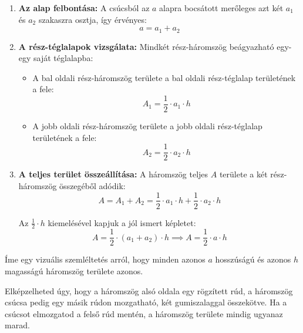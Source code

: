 \documentclass{article}
\begin{document}
\begin{enumerate}
    \item \textbf{Az alap felbontása:} A csúcsból az $a$ alapra bocsátott merőleges azt két $a_1$ és $a_2$ szakaszra osztja, így érvényes:
    $$a = a_1 + a_2$$

    \item \textbf{A rész-téglalapok vizsgálata:} Mindkét rész-háromszög beágyazható egy-egy saját téglalapba:
    \begin{itemize}
        \item A bal oldali rész-háromszög területe a bal oldali rész-téglalap területének a fele:
        $$A_1 = \frac{1}{2} \cdot a_1 \cdot h$$
        \item A jobb oldali rész-háromszög területe a jobb oldali rész-téglalap területének a fele:
        $$A_2 = \frac{1}{2} \cdot a_2 \cdot h$$
    \end{itemize}

    \item \textbf{A teljes terület összeállítása:} A háromszög teljes $A$ területe a két rész-háromszög összegéből adódik:
    $$A = A_1 + A_2 = \frac{1}{2} \cdot a_1 \cdot h + \frac{1}{2} \cdot a_2 \cdot h$$

    Az $\frac{1}{2} \cdot h$ kiemelésével kapjuk a jól ismert képletet:
    $$A = \frac{1}{2} \cdot (a_1 + a_2) \cdot h \implies A = \frac{1}{2} \cdot a \cdot h$$
\end{enumerate}

Íme egy vizuális szemléltetés arról, hogy minden azonos $a$ hosszúságú és azonos $h$ magasságú háromszög területe azonos.

\begin{center}
\centering
{}
\end{center}

Elképzelheted úgy, hogy a háromszög alsó oldala egy rögzített rúd, a háromszög csúcsa pedig egy másik rúdon mozgatható, két gumiszalaggal összekötve. Ha a csúcsot elmozgatod a felső rúd mentén, a háromszög területe mindig ugyanaz marad.
\end{document}
